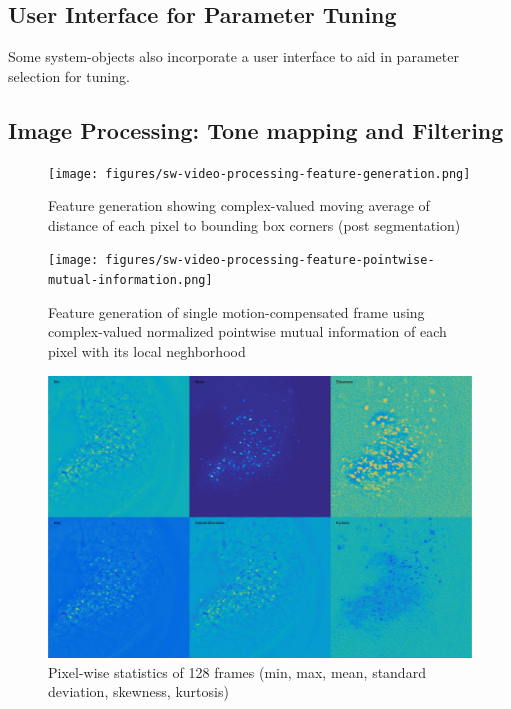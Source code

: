 \subsection{User Interface for Parameter Tuning}\label{sec:user-interface-for-parameter-tuning}

Some system-objects also incorporate a user interface to aid in parameter selection for tuning.

\subsection{Image Processing: Tone mapping and Filtering}\label{sec:image-processing-tonemapping-and-filtering}
\begin{figure}[htb]\centering
	\texttt{[image: figures/sw-video-processing-feature-generation.png]}
	\caption{Feature generation showing complex-valued moving average of distance of each pixel to bounding box corners (post segmentation)}
\end{figure}


\begin{figure}[htb]\centering
	\texttt{[image: figures/sw-video-processing-feature-pointwise-mutual-information.png]}
	\caption{Feature generation of single motion-compensated frame using complex-valued normalized pointwise mutual information of each pixel with its local neghborhood}
\end{figure}



\begin{figure}[htb]\centering
	\includegraphics[width=12cm]{figures/statistics_of_128_frames_contrast_enhanced.jpg}
	\caption{Pixel-wise statistics of 128 frames (min, max, mean, standard deviation, skewness, kurtosis)}
\end{figure}


